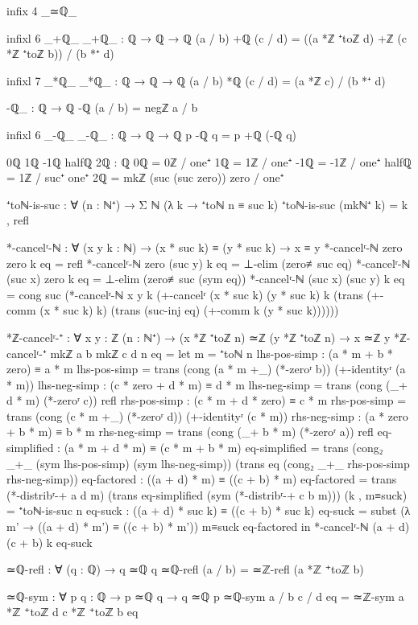 \documentclass[11pt,a4paper]{book}
\begin{document}
\begin{code}
infix 4 _≃ℚ_

infixl 6 _+ℚ_
_+ℚ_ : ℚ → ℚ → ℚ
(a / b) +ℚ (c / d) = ((a *ℤ ⁺toℤ d) +ℤ (c *ℤ ⁺toℤ b)) / (b *⁺ d)

infixl 7 _*ℚ_
_*ℚ_ : ℚ → ℚ → ℚ
(a / b) *ℚ (c / d) = (a *ℤ c) / (b *⁺ d)

-ℚ_ : ℚ → ℚ
-ℚ (a / b) = negℤ a / b

infixl 6 _-ℚ_
_-ℚ_ : ℚ → ℚ → ℚ
p -ℚ q = p +ℚ (-ℚ q)

0ℚ 1ℚ -1ℚ halfℚ 2ℚ : ℚ
0ℚ  = 0ℤ / one⁺
1ℚ  = 1ℤ / one⁺
-1ℚ = -1ℤ / one⁺
halfℚ = 1ℤ / suc⁺ one⁺
2ℚ  = mkℤ (suc (suc zero)) zero / one⁺

⁺toℕ-is-suc : ∀ (n : ℕ⁺) → Σ ℕ (λ k → ⁺toℕ n ≡ suc k)
⁺toℕ-is-suc (mkℕ⁺ k) = k , refl

*-cancelʳ-ℕ : ∀ (x y k : ℕ) → (x * suc k) ≡ (y * suc k) → x ≡ y
*-cancelʳ-ℕ zero zero k eq = refl
*-cancelʳ-ℕ zero (suc y) k eq = ⊥-elim (zero≢suc eq)
*-cancelʳ-ℕ (suc x) zero k eq = ⊥-elim (zero≢suc (sym eq))
*-cancelʳ-ℕ (suc x) (suc y) k eq = 
  cong suc (*-cancelʳ-ℕ x y k (+-cancelʳ (x * suc k) (y * suc k) k 
    (trans (+-comm (x * suc k) k) (trans (suc-inj eq) (+-comm k (y * suc k))))))

*ℤ-cancelʳ-⁺ : ∀ {x y : ℤ} (n : ℕ⁺) → (x *ℤ ⁺toℤ n) ≃ℤ (y *ℤ ⁺toℤ n) → x ≃ℤ y
*ℤ-cancelʳ-⁺ {mkℤ a b} {mkℤ c d} n eq = 
  let m = ⁺toℕ n
      lhs-pos-simp : (a * m + b * zero) ≡ a * m
      lhs-pos-simp = trans (cong (a * m +_) (*-zeroʳ b)) (+-identityʳ (a * m))
      lhs-neg-simp : (c * zero + d * m) ≡ d * m
      lhs-neg-simp = trans (cong (_+ d * m) (*-zeroʳ c)) refl
      rhs-pos-simp : (c * m + d * zero) ≡ c * m
      rhs-pos-simp = trans (cong (c * m +_) (*-zeroʳ d)) (+-identityʳ (c * m))
      rhs-neg-simp : (a * zero + b * m) ≡ b * m
      rhs-neg-simp = trans (cong (_+ b * m) (*-zeroʳ a)) refl
      eq-simplified : (a * m + d * m) ≡ (c * m + b * m)
      eq-simplified = trans (cong₂ _+_ (sym lhs-pos-simp) (sym lhs-neg-simp))
                      (trans eq (cong₂ _+_ rhs-pos-simp rhs-neg-simp))
      eq-factored : ((a + d) * m) ≡ ((c + b) * m)
      eq-factored = trans (*-distribʳ-+ a d m) 
                    (trans eq-simplified (sym (*-distribʳ-+ c b m)))
      (k , m≡suck) = ⁺toℕ-is-suc n
      eq-suck : ((a + d) * suc k) ≡ ((c + b) * suc k)
      eq-suck = subst (λ m' → ((a + d) * m') ≡ ((c + b) * m')) m≡suck eq-factored
  in *-cancelʳ-ℕ (a + d) (c + b) k eq-suck

≃ℚ-refl : ∀ (q : ℚ) → q ≃ℚ q
≃ℚ-refl (a / b) = ≃ℤ-refl (a *ℤ ⁺toℤ b)

≃ℚ-sym : ∀ {p q : ℚ} → p ≃ℚ q → q ≃ℚ p
≃ℚ-sym {a / b} {c / d} eq = ≃ℤ-sym {a *ℤ ⁺toℤ d} {c *ℤ ⁺toℤ b} eq


\end{code}
\end{document}
